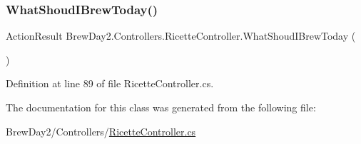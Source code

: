\subsubsection{\texorpdfstring{What\+Shoud\+I\+Brew\+Today()}{WhatShoudIBrewToday()}}
{\footnotesize\ttfamily Action\+Result Brew\+Day2.\+Controllers.\+Ricette\+Controller.\+What\+Shoud\+I\+Brew\+Today (\begin{DoxyParamCaption}{ }\end{DoxyParamCaption})}



Definition at line 89 of file Ricette\+Controller.\+cs.



The documentation for this class was generated from the following file\+:\begin{DoxyCompactItemize}
\item 
Brew\+Day2/\+Controllers/\mbox{\hyperlink{_ricette_controller_8cs}{Ricette\+Controller.\+cs}}\end{DoxyCompactItemize}
